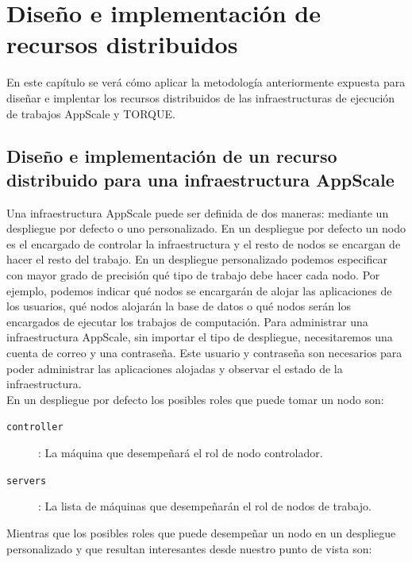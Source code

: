 \chapter{Diseño e implementación de recursos distribuidos}
\label{cap:disenyo}


En este capítulo se verá cómo aplicar la metodología anteriormente expuesta para diseñar e implentar los recursos distribuidos de las infraestructuras de ejecución de trabajos AppScale y TORQUE.

\section{Diseño e implementación de un recurso distribuido para una infraestructura AppScale}

Una infraestructura AppScale puede ser definida de dos maneras: mediante un despliegue por defecto o uno personalizado. En un despliegue por defecto un nodo es el encargado de controlar la infraestructura y el resto de nodos se encargan de hacer el resto del trabajo. En un despliegue personalizado podemos especificar con mayor grado de precisión qué tipo de trabajo debe hacer cada nodo. Por ejemplo, podemos indicar qué nodos se encargarán de alojar las aplicaciones de los usuarios, qué nodos alojarán la base de datos o qué nodos serán los encargados de ejecutar los trabajos de computación. Para administrar una infraestructura AppScale, sin importar el tipo de despliegue, necesitaremos una cuenta de correo y una contraseña. Este usuario y contraseña son necesarios para poder administrar las aplicaciones alojadas y observar el estado de la infraestructura. \\

En un despliegue por defecto los posibles roles que puede tomar un nodo son:

\begin{description}
\item[\texttt{controller}]: La máquina que desempeñará el rol de nodo controlador.
\item[\texttt{servers}]: La lista de máquinas que desempeñarán el rol de nodos de trabajo.
\end{description}

Mientras que los posibles roles que puede desempeñar un nodo en un despliegue personalizado y que resultan interesantes desde nuestro punto de vista son:

